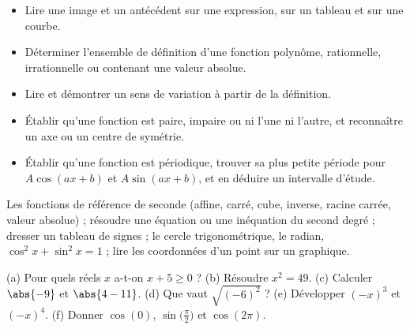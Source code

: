 \begin{objectives}
\begin{itemize}
\item Lire une image et un antécédent sur une expression, sur un tableau et sur une courbe.
\item Déterminer l'ensemble de définition d'une fonction polynôme, rationnelle, irrationnelle ou contenant une valeur absolue.
\item Lire et démontrer un sens de variation à partir de la définition.
\item Établir qu'une fonction est paire, impaire ou ni l'une ni l'autre, et reconnaître un axe ou un centre de symétrie.
\item Établir qu'une fonction est périodique, trouver sa plus petite période pour $A\cos(ax+b)$ et $A\sin(ax+b)$, et en déduire un intervalle d'étude.
\end{itemize}
\end{objectives}
\begin{prerequisites}
Les fonctions de référence de seconde (affine, carré, cube, inverse, racine carrée, valeur absolue) ; résoudre une équation ou une inéquation du second degré ; dresser un tableau de signes ; le cercle trigonométrique, le radian, $\cos^2x+\sin^2x=1$ ; lire les coordonnées d'un point sur un graphique.
\end{prerequisites}
\begin{fluency}[5 min]
(a) Pour quels réels $x$ a-t-on $x+5\ge0$ ? (b) Résoudre $x^2=49$. (c) Calculer $\abs{-9}$ et $\abs{4-11}$. (d) Que vaut $\sqrt{(-6)^2}$ ? (e) Développer $(-x)^3$ et $(-x)^4$. (f) Donner $\cos(0)$, $\sin\bigl(\frac{\pi}{2}\bigr)$ et $\cos(2\pi)$.
\end{fluency}

